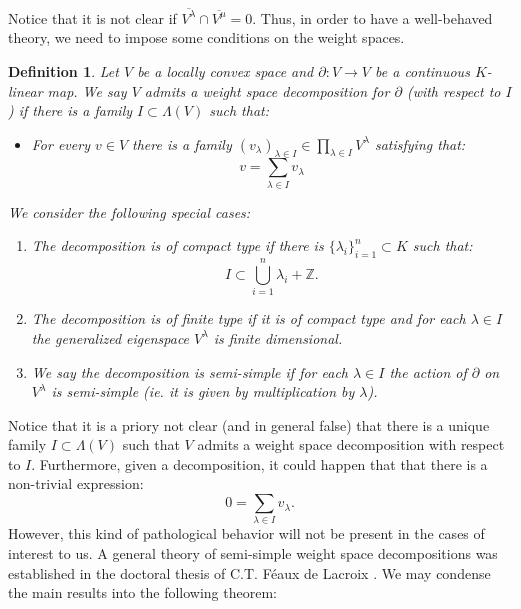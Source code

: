 \documentclass{amsart}
\newtheorem{defi}{ Definition}[subsection]
\begin{document}
Notice that it is not clear if $\overline{V^{\lambda}}\cap \overline{V^{\mu}}=0$. Thus, in order to have a well-behaved theory, we need to impose some conditions on the weight spaces.
\begin{defi}
Let $V$ be a locally convex space and $\partial:V\rightarrow V$ be a continuous $K$-linear map. We say $V$ admits a weight space decomposition  for $\partial$ (with respect to $I$) if there is a family $I\subset \Lambda(V)$ such that:
\begin{itemize}
    \item For every $v\in V$ there is a family $(v_{\lambda})_{\lambda\in I}\in \prod_{\lambda\in I}V^{\lambda}$ satisfying that:
    \begin{equation*}
        v=\sum_{\lambda \in I}v_{\lambda}
    \end{equation*}
\end{itemize}
We consider the following special cases:
\begin{enumerate}[label=(\roman*)]
    \item The decomposition is of compact type if there is $\{\lambda_i\}_{i=1}^n\subset K$ such that:
    \begin{equation*}
        I\subset \bigcup_{i=1}^n \lambda_i+\mathbb{Z}.
    \end{equation*}
    \item The decomposition is of finite type if it is of  compact type and for each $\lambda \in I$ the generalized eigenspace $V^{\lambda}$ is finite dimensional.
    \item We say the decomposition is semi-simple if for each $\lambda\in I$ the action of $\partial$ on $V^{\lambda}$ is semi-simple (ie. it is given by multiplication by $\lambda$). 
\end{enumerate}
\end{defi}
Notice that it is a priory not clear (and in general false) that there is a unique family $I\subset \Lambda(V)$ such that $V$ admits a weight space decomposition with respect to $I$. Furthermore, given a decomposition, it could happen that that there is a non-trivial expression:
\begin{equation*}
    0=\sum_{\lambda \in I}v_{\lambda}.
\end{equation*}
However, this kind of pathological behavior will not be present in the cases of interest to us. A general theory of semi-simple weight space decompositions was established in the doctoral thesis of C.T. Féaux de Lacroix \cite{diagonFrechet modules}. We may condense the main results into the following theorem:
\end{document}
